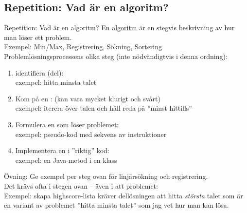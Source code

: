 

\ifkompendium\else
\subsection{Repetition: Vad är en algoritm?}
\begin{Slide}{Repetition: Vad är en algoritm? }\SlideFontSmall
En \href{https://sv.wikipedia.org/wiki/Algoritm}{algoritm} är en stegvis beskrivning av hur man löser ett problem. \\ 
Exempel: Min/Max, Registrering, Sökning, Sortering \\
\vspace{1em}
Problemlösningsprocessens olika steg (inte nödvändigtvis i denna ordning): 
\begin{enumerate}
\item identifiera (del): \\ exempel: hitta minsta talet
\item Kom på en : (kan  vara mycket klurigt och svårt) \\ exempel: iterera över talen och håll reda på ''minst hittills''
\item Formulera en  som löser problemet: \\ exempel: pseudo-kod med sekvens av instruktioner
\item Implementera en  i ''riktig'' kod: \\ exempel: en Java-metod i en klass
\end{enumerate}
Övning: Ge exempel per steg ovan för linjärsökning och registrering. \\
Det krävs ofta  i stegen ovan  -- även i att  problemet: \\ Exempel: skapa highscore-lista kräver dellösningen att hitta \emph{största} talet som är en variant av problemet ''hitta minsta talet'' som jag vet hur man kan lösa.
\end{Slide}


\fi











